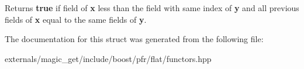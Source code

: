 \begin{DoxyReturn}{Returns}
{\bfseries true} if field of {\bfseries x} less than the field with same index of {\bfseries y} and all previous fields of {\bfseries x} equal to the same fields of {\bfseries y}.
\end{DoxyReturn}


The documentation for this struct was generated from the following file\+:\begin{DoxyCompactItemize}
\item 
externals/magic\+\_\+get/include/boost/pfr/flat/functors.\+hpp\end{DoxyCompactItemize}
